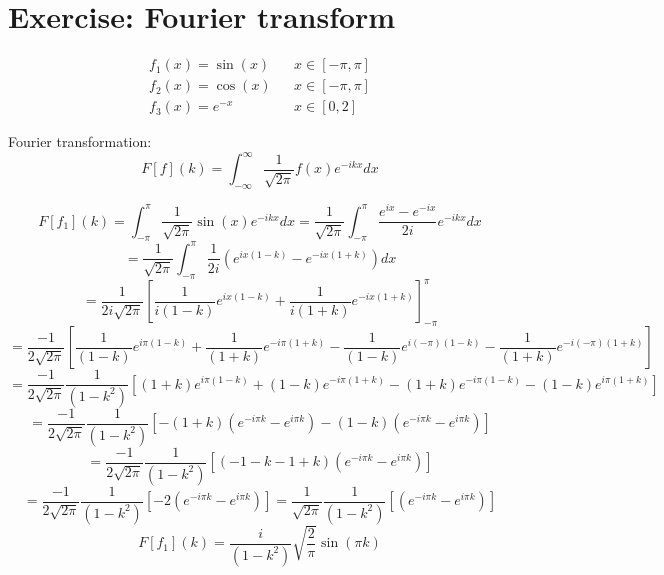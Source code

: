 \documentclass[11pt]{article}
\begin{document}
\date{\today}

\section{Exercise: Fourier transform}

\[ \begin{aligned}
	f_1(x) = \sin(x) &  &  x \in [-\pi,\pi] \\
	f_2(x) = \cos(x) &  &  x \in [-\pi,\pi] \\
	f_3(x) = e^{-x} &  &  x \in [0,2]
\end{aligned} \]

Fourier transformation:
\[ F[f](k) = \int_{-\infty}^{\infty} \frac{1}{\sqrt{2\pi}} f(x) e^{-ikx} dx \]

\[ F[f_1](k) = \int_{-\pi}^{\pi} \frac{1}{\sqrt{2\pi}} \sin(x) e^{-ikx} dx =  \frac{1}{\sqrt{2\pi}} \int_{-\pi}^{\pi} \frac{e^{ix}-e^{-ix}}{2i} e^{-ikx} dx \]
\[ = \frac{1}{\sqrt{2\pi}} \int_{-\pi}^{\pi} \frac{1}{2i} \left(e^{ix(1-k)} - e^{-ix(1+k)}\right) dx \]
\[ = \frac{1}{2i\sqrt{2\pi}} \left[\frac{1}{i(1-k)}e^{ix(1-k)} + \frac{1}{i(1+k)}e^{-ix(1+k)}\right]_{-\pi}^{\pi} \]
\[ = \frac{-1}{2\sqrt{2\pi}} \left[\frac{1}{(1-k)}e^{i\pi(1-k)} + \frac{1}{(1+k)}e^{-i\pi(1+k)} - \frac{1}{(1-k)}e^{i(-\pi)(1-k)} - \frac{1}{(1+k)}e^{-i(-\pi)(1+k)}\right]\]
\[ = \frac{-1}{2\sqrt{2\pi}}\frac{1}{(1 - k^2)} \left[(1+k)e^{i\pi(1-k)} + (1-k)e^{-i\pi(1+k)} - (1+k)e^{-i\pi(1-k)} - (1-k)e^{i\pi(1+k)}\right]\]
\[ = \frac{-1}{2\sqrt{2\pi}}\frac{1}{(1 - k^2)} \left[-(1+k)(e^{- i\pi k} - e^{i\pi k}) - (1-k)(e^{-i\pi k}  - e^{i\pi k})\right]\]
\[ = \frac{-1}{2\sqrt{2\pi}}\frac{1}{(1 - k^2)} \left[(- 1 - k - 1 + k)(e^{- i\pi k} - e^{i\pi k})\right]\]
\[ = \frac{-1}{2\sqrt{2\pi}}\frac{1}{(1 - k^2)} \left[-2 (e^{- i\pi k} - e^{i\pi k})\right] = \frac{1}{\sqrt{2\pi}}\frac{1}{(1 - k^2)} \left[ (e^{- i\pi k} - e^{i\pi k})\right]\]
\[ F[f_1](k) = \frac{i}{(1 - k^2)}\sqrt{\frac{2}{\pi}} \sin(\pi k)\]
\end{document}

